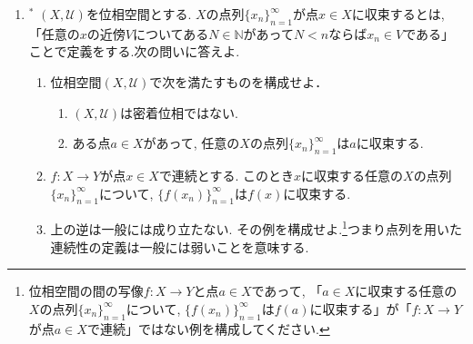 \documentclass[dvipdfmx,a4paper,11pt]{article}
\newcommand{\N}{\mathbb{N}}
\theoremstyle{definition}
\begin{document}
\begin{enumerate}[ label=\textbf{問}\ref*{sec-conti}.\arabic*]
 



	
\item \label{pointwise}$^*$  $(X, \mathscr{U})$を位相空間とする.
$X$の点列$\{ x_n\}_{n =1}^{\infty}$が点$x\in X$に収束するとは, 「任意の$x$の近傍$V$についてある$N \in \N$があって$N<n$ならば$x_n \in V$である」ことで定義をする.次の問いに答えよ.
	\begin{enumerate}
	\setlength{\parskip}{0cm} 
  \setlength{\itemsep}{0cm} 
	\item 位相空間$(X, \mathscr{U})$で次を満たすものを構成せよ．
		\begin{enumerate}
		\setlength{\parskip}{0cm} 
  \setlength{\itemsep}{0cm} 
		\item $(X, \mathscr{U})$は密着位相ではない.
		\item ある点$a \in X$があって, 任意の$X$の点列$\{ x_n\}_{n =1}^{\infty}$は$a$に収束する.
		\end{enumerate}
	\item $f :X\rightarrow Y$が点$x\in X$で連続とする. このとき$x$に収束する任意の$X$の点列$\{ x_n\}_{n =1}^{\infty}$について, $\{ f(x_n)\}_{n =1}^{\infty}$は$f(x)$に収束する.
	\item 上の逆は一般には成り立たない. その例を構成せよ.\footnote{位相空間の間の写像$f :X\rightarrow Y$と点$a \in X$であって, 「$a \in X$に収束する任意の$X$の点列$\{ x_n\}_{n =1}^{\infty}$について, $\{ f(x_n)\}_{n =1}^{\infty}$は$f(a)$に収束する」が「$f :X\rightarrow Y$が点$a\in X$で連続」ではない例を構成してください.}つまり点列を用いた連続性の定義は一般には弱いことを意味する.
	\end{enumerate}
 \end{enumerate}



\newpage
\end{document}
